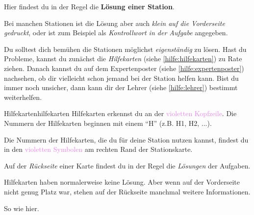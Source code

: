 \documentclass[lerntheke,12pt,a5paper,landscape]{arbeitsblatt}
\begin{document}
\begin{loesungskarte}
\begin{center}
Hier findest du in der Regel die \textbf{Lösung einer Station}.
\end{center}

Bei manchen Stationen ist die Lösung aber auch \emph{klein auf die Vorderseite gedruckt}, oder ist zum Beispiel als \emph{Kontrollwort in der Aufgabe} angegeben.

\bigskip
Du solltest dich bemühen die Stationen möglichst \emph{eigenständig} zu lösen. Hast du Probleme, kannst du zunächst die \emph{Hilfekarten} (siehe \ref{hilfe:hilfekarten}) zu Rate ziehen. Danach kannst du auf dem Expertenposter (siehe \ref{hilfe:expertenposter}) nachsehen, ob dir vielleicht schon jemand bei der Station helfen kann. Bist du immer noch unsicher, dann kann dir der Lehrer (siehe \ref{hilfe:lehrer}) bestimmt weiterhelfen.
\end{loesungskarte}

\begin{hilfekarte}{Hilfekarten}{hilfekarten}
Hilfekarten erkennst du an der \textcolor{violet}{violetten Kopfzeile}. Die Nummern der Hilfekarten beginnen mit einem \enquote{H} (z.B. H1, H2, ...).

\begin{center}\end{center}

Die Nummern der Hilfekarten, die du für deine Station nutzen kannst, findest du in den \textcolor{violet}{violetten Symbolen} am rechten Rand der Stationskarte.

\begin{center}
\end{center}
\end{hilfekarte}


\begin{loesungskarte}[Rückseiten]
Auf der \emph{Rückseite} einer Karte findest du in der Regel die \emph{Lösungen} der Aufgaben.

\medskip
Hilfekarten haben normalerweise keine Lösung. Aber wenn auf der Vorderseite nicht genug Platz war, stehen auf der Rückseite manchmal weitere Informationen.

\medskip
So wie hier. \faSmileWink
\end{loesungskarte}
\end{document}
